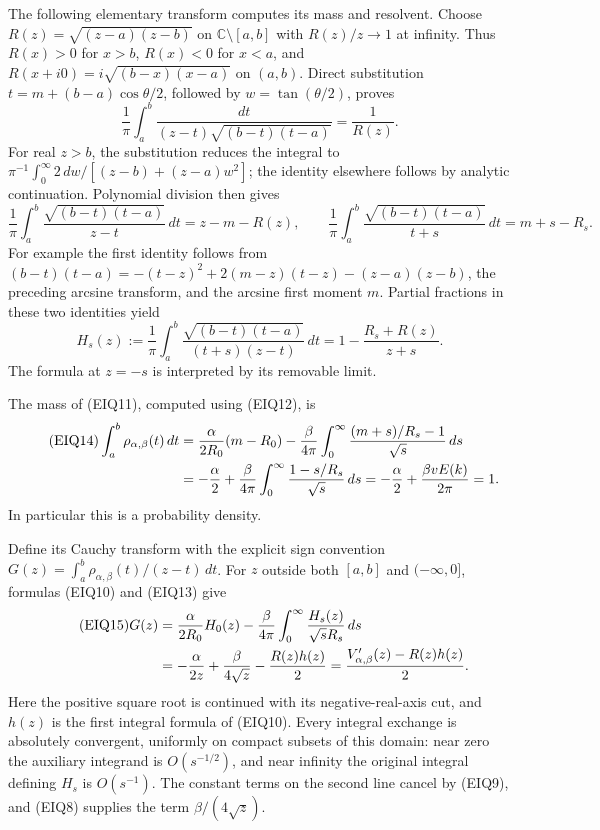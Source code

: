 \documentclass[11pt,a4paper]{article}
\begin{document}
The following elementary transform computes its mass and resolvent.
Choose $R(z)=\sqrt{(z-a)(z-b)}$ on $\mathbb C\setminus[a,b]$ with
$R(z)/z\to1$ at infinity. Thus $R(x)>0$ for $x>b$,
$R(x)<0$ for $x<a$, and $R(x+i0)=i\sqrt{(b-x)(x-a)}$ on $(a,b)$.
Direct substitution $t=m+(b-a)\cos\theta/2$, followed by
$w=\tan(\theta/2)$, proves
\[
 \frac1\pi\int_a^b\frac{dt}{(z-t)\sqrt{(b-t)(t-a)}}=\frac1{R(z)}.
\]
For real $z>b$, the substitution reduces the integral to
$\pi^{-1}\int_0^\infty2\,dw/[(z-b)+(z-a)w^2]$;
the identity elsewhere follows by analytic continuation.
Polynomial division then gives
\begin{equation}\tag{EIQ12}
 \frac1\pi\int_a^b\frac{\sqrt{(b-t)(t-a)}}{z-t}\,dt
     =z-m-R(z),\qquad
 \frac1\pi\int_a^b\frac{\sqrt{(b-t)(t-a)}}{t+s}\,dt
     =m+s-R_s.
\end{equation}
For example the first identity follows from
$(b-t)(t-a)=-(t-z)^2+2(m-z)(t-z)-(z-a)(z-b)$,
the preceding arcsine transform, and the arcsine first moment $m$.
Partial fractions in these two identities yield
\begin{equation}\tag{EIQ13}
 H_s(z):=\frac1\pi\int_a^b
       \frac{\sqrt{(b-t)(t-a)}}{(t+s)(z-t)}\,dt
       =1-\frac{R_s+R(z)}{z+s}.
\end{equation}
The formula at $z=-s$ is interpreted by its removable limit.

The mass of (EIQ11), computed using (EIQ12), is
\begin{align}\tag{EIQ14}
 \int_a^b\rho_{\alpha,\beta}(t)\,dt
 &=\frac\alpha{2R_0}(m-R_0)
 -\frac\beta{4\pi}\int_0^\infty
       \frac{(m+s)/R_s-1}{\sqrt s}\,ds\\
 &=-\frac\alpha2+
   \frac\beta{4\pi}\int_0^\infty\frac{1-s/R_s}{\sqrt s}\,ds
 =-\frac\alpha2+\frac{\beta vE(k)}{2\pi}=1.\notag
\end{align}
In particular this is a probability density.

Define its Cauchy transform with the explicit sign convention
$G(z)=\int_a^b\rho_{\alpha,\beta}(t)/(z-t)\,dt$.
For $z$ outside both $[a,b]$ and $(-\infty,0]$, formulas (EIQ10) and
(EIQ13) give
\begin{align}\tag{EIQ15}
 G(z)
 &=\frac\alpha{2R_0}H_0(z)
       -\frac\beta{4\pi}
          \int_0^\infty\frac{H_s(z)}{\sqrt sR_s}\,ds\\
 &=-\frac\alpha{2z}+\frac\beta{4\sqrt z}
       -\frac{R(z)h(z)}2
 =\frac{V'_{\alpha,\beta}(z)-R(z)h(z)}2.\notag
\end{align}
Here the positive square root is continued with its negative-real-axis
cut, and $h(z)$ is the first integral formula of (EIQ10).  Every integral
exchange is absolutely convergent, uniformly on compact subsets of this
domain: near zero the auxiliary integrand is $O(s^{-1/2})$, and near
infinity the original integral defining $H_s$ is $O(s^{-1})$.
The constant terms on the second line cancel by (EIQ9), and (EIQ8)
supplies the term $\beta/(4\sqrt z)$.
\end{document}
